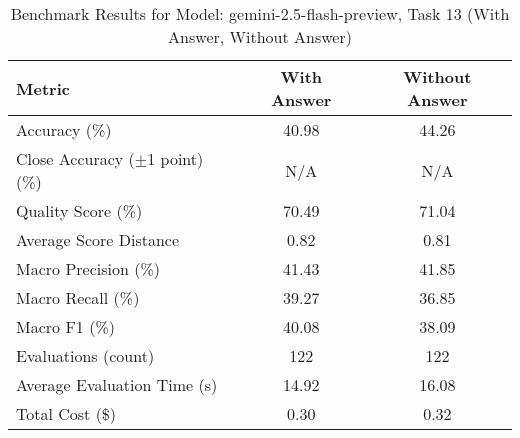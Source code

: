 \begin{table}[htbp]
\centering
\caption{Benchmark Results for Model: gemini-2.5-flash-preview, Task 13 (With Answer, Without Answer)}
\begin{tabular}{lcc}
\toprule
\textbf{Metric} & \textbf{With Answer} & \textbf{Without Answer} \\
\midrule
Accuracy (\%) & 40.98 & 44.26 \\
Close Accuracy ($\pm$1 point) (\%) & N/A & N/A \\
Quality Score (\%) & 70.49 & 71.04 \\
Average Score Distance & 0.82 & 0.81 \\
Macro Precision (\%) & 41.43 & 41.85 \\
Macro Recall (\%) & 39.27 & 36.85 \\
Macro F1 (\%) & 40.08 & 38.09 \\
Evaluations (count) & 122 & 122 \\
Average Evaluation Time (s) & 14.92 & 16.08 \\
Total Cost (\$) & 0.30 & 0.32 \\
\bottomrule
\end{tabular}
\end{table}